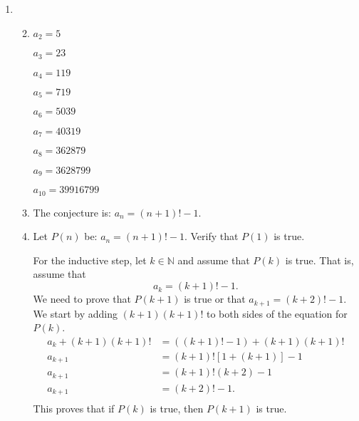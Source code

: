 \begin{enumerate}
\item \begin{enumerate} \setcounter{enumii}{1}
\item \begin{multicols}{3}
$a_2 = 5$

$a_3 = 23$

$a_4 = 119$

$a_5 = 719$

$a_6 = 5039$

$a_7 = 40319$

$a_8 = 362879$

$a_9 = 3628799$

$a_{10} = 39916799$
\end{multicols}

\item The conjecture is: $a_n = \left( n + 1 \right)! - 1$.

\item Let $P \left( n \right)$ be: $a_n = \left( n + 1 \right)! - 1$.  Verify that 
$P \left( 1 \right)$ is true.

For the inductive step, let $k \in \mathbb{N}$ and assume that $P \left( k \right)$ is true.  That is, assume that
\[
a_k = \left( k + 1 \right)! - 1.
\]
We need to prove that $P \left( k + 1 \right)$ is true or that 
$a_{k+1} = \left( k + 2 \right)! - 1$.  We start by adding 
$\left( k + 1 \right) \left( k + 1 \right)!$ to both sides of the equation for 
$P \left( k \right)$.
\[
\begin{aligned}
a_k + \left( k + 1 \right) \left( k + 1 \right)! &= \left( \left( k + 1 \right)! - 1 \right) + \left( k + 1 \right) \left( k + 1 \right)! \\
a_{k+1} &= \left( k + 1 \right)! \left[ 1 + \left( k + 1 \right) \right] - 1 \\
a_{k+1} &= \left( k + 1 \right)! \left( k + 2 \right) - 1 \\
a_{k+1} &= \left( k + 2 \right)! - 1. \\
\end{aligned}
\]
This proves that if $P \left( k  \right)$ is true, then $P \left( k + 1 \right)$ is true.
\end{enumerate}




\end{enumerate}
